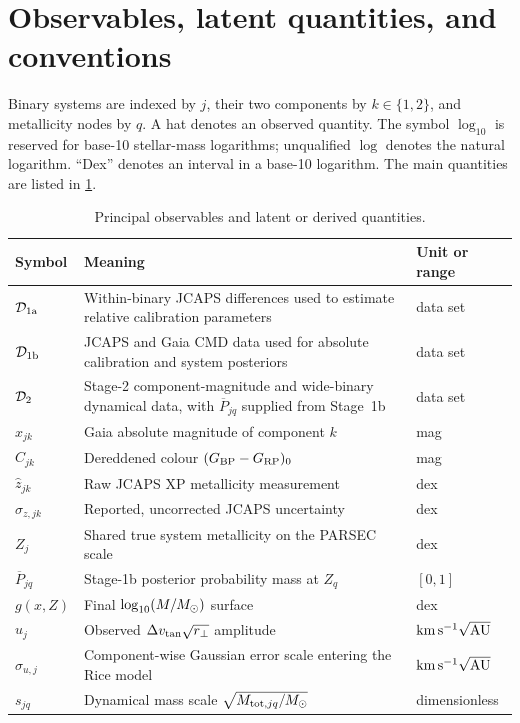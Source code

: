 \section{Observables, latent quantities, and conventions}
\label{sec:notation}

Binary systems are indexed by $j$, their two components by $k\in\{1,2\}$,
and metallicity nodes by $q$.  A hat denotes an observed quantity.  The symbol
$\log_{10}$ is reserved for base-10 stellar-mass logarithms; unqualified
$\log$ denotes the natural logarithm.  ``Dex'' denotes an interval in a
base-10 logarithm.  The main quantities are listed in \cref{tab:notation}.

\begin{table}[htbp]
\centering
\caption{Principal observables and latent or derived quantities.}
\label{tab:notation}
\begin{tabularx}{\textwidth}{@{}lXl@{}}
\toprule
Symbol & Meaning & Unit or range \\
\midrule
$\mathcal D_{\rm 1a}$ & Within-binary JCAPS differences used to estimate relative calibration parameters & data set \\
$\mathcal D_{\rm 1b}$ & JCAPS and Gaia CMD data used for absolute calibration and system posteriors & data set \\
$\mathcal D_{\rm 2}$ & Stage-2 component-magnitude and wide-binary dynamical data, with $\overline P_{jq}$ supplied from Stage~1b & data set \\
$x_{jk}$ & Gaia absolute magnitude of component $k$ & mag \\
$C_{jk}$ & Dereddened colour $(G_{\rm BP}-G_{\rm RP})_0$ & mag \\
$\widehat z_{jk}$ & Raw JCAPS XP metallicity measurement & dex \\
$\sigma_{z,jk}$ & Reported, uncorrected JCAPS uncertainty & dex \\
$Z_j$ & Shared true system metallicity on the PARSEC scale & dex \\
$\overline P_{jq}$ & Stage-1b posterior probability mass at $Z_q$ & $[0,1]$ \\
$g(x,Z)$ & Final $\log_{10}(M/M_{\odot})$ surface & dex \\
$u_j$ & Observed $\Delta v_{\rm tan}\sqrt{r_\perp}$ amplitude & $\mathrm{km}\,\mathrm{s}^{-1}\sqrt{\mathrm{AU}}$ \\
$\sigma_{u,j}$ & Component-wise Gaussian error scale entering the Rice model & $\mathrm{km}\,\mathrm{s}^{-1}\sqrt{\mathrm{AU}}$ \\
$s_{jq}$ & Dynamical mass scale $\sqrt{M_{{\rm tot},jq}/M_{\odot}}$ & dimensionless \\
\bottomrule
\end{tabularx}
\end{table}
\FloatBarrier

